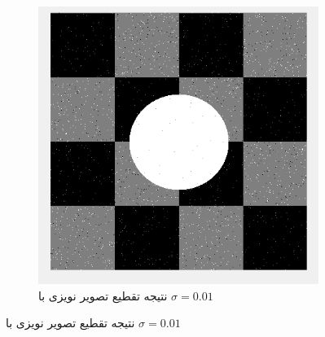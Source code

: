 \documentclass[11.5pt,a4paper]{article}
\begin{document}
\begin{figure}[h]
\begin{subfigure}{.3\textwidth}
		\includegraphics[scale=0.2]{Imgs/NB_S01_Res.png}
		\caption{نتیجه تقطیع تصویر نویزی با $\sigma=0.01$}
	\end{subfigure}


\end{figure}
\end{document}

